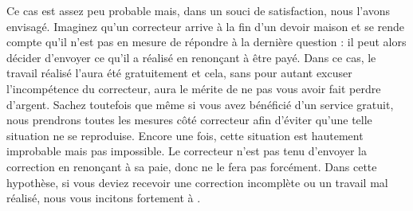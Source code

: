 ﻿Ce cas est assez peu probable mais, dans un souci de satisfaction, nous l'avons envisagé. Imaginez qu'un correcteur arrive à la fin d'un devoir maison et se rende compte qu'il n'est pas en mesure de répondre à la dernière question : il peut alors décider d'envoyer ce qu'il a réalisé en renonçant à être payé. Dans ce cas, le travail réalisé l'aura été gratuitement et cela, sans pour autant excuser l'incompétence du correcteur, aura le mérite de ne pas vous avoir fait perdre d'argent. Sachez toutefois que même si vous avez bénéficié d'un service gratuit, nous prendrons toutes les mesures côté correcteur afin d'éviter qu'une telle situation ne se reproduise. Encore une fois, cette situation est hautement improbable mais pas impossible.
Le correcteur n'est pas tenu d'envoyer la correction en renonçant à sa paie, donc ne le fera pas forcément. Dans cette hypothèse, si vous deviez recevoir une correction incomplète ou un travail mal réalisé, nous vous incitons fortement à .